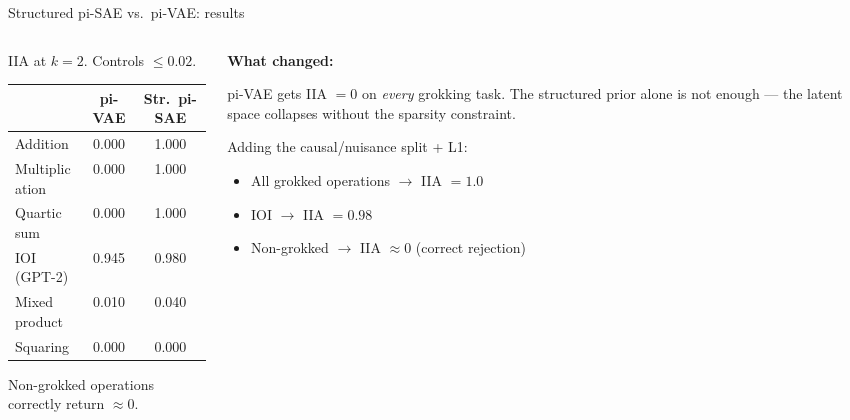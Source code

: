 \documentclass[aspectratio=169,11pt]{beamer}
\begin{document}
\begin{frame}{Structured pi-SAE vs.\ pi-VAE: results}

\begin{columns}[T]
\begin{column}{0.48\textwidth}
{\small IIA at $k{=}2$. Controls $\leq 0.02$.}

\vspace{0.5em}
\centering
{\small
\begin{tabular}{@{}lcc@{}}
\toprule
& \textbf{pi-VAE} & \textbf{Str.\ pi-SAE} \\
\midrule
Addition & 0.000 & \textcolor{always}{1.000} \\
Multiplication & 0.000 & \textcolor{always}{1.000} \\
Quartic sum & 0.000 & \textcolor{always}{1.000} \\
IOI (GPT-2) & 0.945 & \textcolor{always}{0.980} \\
\midrule
Mixed product & 0.010 & 0.040 \\
Squaring & 0.000 & 0.000 \\
\bottomrule
\end{tabular}}

\vspace{0.3em}
\flushleft
{\scriptsize Non-grokked operations correctly return $\approx 0$.}
\end{column}
\begin{column}{0.48\textwidth}
{\small \textbf{What changed:}}

\vspace{0.3em}
{\small pi-VAE gets IIA $= 0$ on \textit{every} grokking task. The structured prior alone is not enough --- the latent space collapses without the sparsity constraint.}

\vspace{0.5em}
{\small Adding the causal/nuisance split + L1:}
\begin{itemize}\setlength{\itemsep}{2pt}
  \item {\small All grokked operations $\to$ IIA $= 1.0$}
  \item {\small IOI $\to$ IIA $= 0.98$}
  \item {\small Non-grokked $\to$ IIA $\approx 0$ (correct rejection)}
\end{itemize}

\vspace{0.5em}
\end{column}
\end{columns}
\end{frame}
\end{document}
